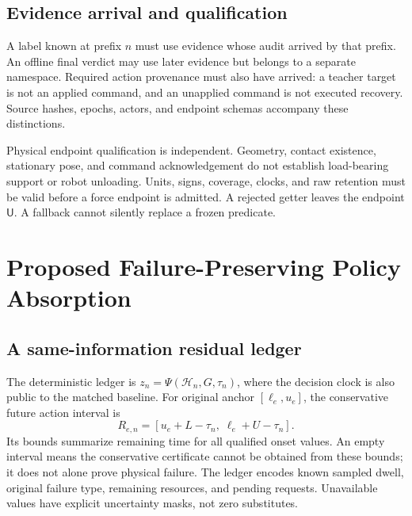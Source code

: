 \documentclass{article}
\newcommand{\Unk}{\ensuremath{\mathsf{U}}}
\newcommand{\Hist}{\mathcal{H}}
\begin{document}
\subsection{Evidence arrival and qualification}
A label known at prefix \(n\) must use evidence whose audit arrived by that prefix. An offline final verdict may use later evidence but belongs to a separate namespace. Required action provenance must also have arrived: a teacher target is not an applied command, and an unapplied command is not executed recovery. Source hashes, epochs, actors, and endpoint schemas accompany these distinctions.

Physical endpoint qualification is independent. Geometry, contact existence, stationary pose, and command acknowledgement do not establish load-bearing support or robot unloading. Units, signs, coverage, clocks, and raw retention must be valid before a force endpoint is admitted. A rejected getter leaves the endpoint \Unk. A fallback cannot silently replace a frozen predicate.

\section{Proposed Failure-Preserving Policy Absorption}
\subsection{A same-information residual ledger}
The deterministic ledger is \(z_n=\Psi(\Hist_n,G,\tau_n)\), where the decision clock is also public to the matched baseline. For original anchor \([\ell_e,u_e]\), the conservative future action interval is
\begin{equation}
R_{e,n}=[u_e+L-\tau_n,\;\ell_e+U-\tau_n].
\label{eq:residual}
\end{equation}
Its bounds summarize remaining time for all qualified onset values. An empty interval means the conservative certificate cannot be obtained from these bounds; it does not alone prove physical failure. The ledger encodes known sampled dwell, original failure type, remaining resources, and pending requests. Unavailable values have explicit uncertainty masks, not zero substitutes.
\end{document}

